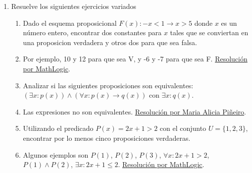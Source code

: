 \documentclass[a4paper]{article}
\newcommand{\answer}{\item[**]}
\newcommand{\exercise}{\item}
\newcommand{\then}{\to}
\begin{document}
\begin{enumerate}[resume]
\begin{multicols}{2}
\begin{enumerate} [label=(\alph*)]
		\item Algunos sillones están tapizados. Algunos sillones son blancos. Todos los sillones blancos tienen almohadones. Por lo tanto, algunos sillones están tapizados y tienen almohadones.
		\answer Razonamiento inválido. Se puede demostrar por contraejemplo, definiendo un universo de sillones a elección. \href{https://youtu.be/kszEIGQ1XOA}{Resolución por Maria Alicia Piñeiro}.

		\item Todos los sillones están tapizados. Algunos sillones son blancos. Todos los sillones blancos tienen almohadones. Por lo tanto, algunos sillones están tapizados y tienen almohadones.
		\answer Razonamiento válido. Se puede demostrar por contraejemplo, definiendo un universo de sillones a elección. \href{https://youtu.be/kszEIGQ1XOA?t=285}{Resolución por Maria Alicia Piñeiro}.

		\item Todos los bebes de terapia estaban en incubadora o con respirador. Los que estaban en incubadora eran prematuros y de bajo peso. Lucio, uno de los bebes de terapia, tenía buen peso. Por lo tanto, al menos un bebé de terapia estaba con respirador.
		\answer Razonamiento válido. \href{https://youtu.be/6QGZCc6QbVE}{Resolución por Maria Alicia Piñeiro} y su \href{https://youtu.be/C-BJgBFUIPA}{continuación}.

	\end{enumerate}
	\end{multicols}

	\exercise Resuelve los siguientes ejercicios variados
	\begin{enumerate} [label=(\alph*)]

		\item Dado el esquema proposicional $F(x): -x<1 \then x>5$ donde $x$ es un número entero, encontrar dos constantes para $x$ tales que se conviertan en una proposicion verdadera y otros dos para que sea falsa.
		\answer Por ejemplo, 10 y 12 para que sea V, y -6 y -7 para que sea F. \href{https://youtu.be/DLsV_L097gE?t=687}{Resolución por MathLogic}.

		\item Analizar si las siguientes proposiciones son equivalentes: $\left(\exists x: p(x)\right) \land \left( \forall x: p(x) \then q(x) \right)$ con $\exists x: q(x)$.
		\answer Las expresiones no son equivalentes. \href{https://youtu.be/WC7P8FMIHFw}{Resolución por Maria Alicia Piñeiro}.

		\item Utilizando el predicado $P(x) = 2x+1 >2$ con el conjunto $U=\{1,2,3\}$, encontrar por lo menos cinco proposiciones verdaderas.
		\answer Algunos ejemplos son $P(1)$, $P(2)$, $P(3)$, $\forall x: 2x+1>2$, $P(1) \land P(2)$, $\exists x: 2x+1 \leq 2$. \href{https://youtu.be/rnaCiSpVtP4?t=633}{Resolución por MathLogic}.


\end{enumerate}
\end{enumerate}
\end{document}
